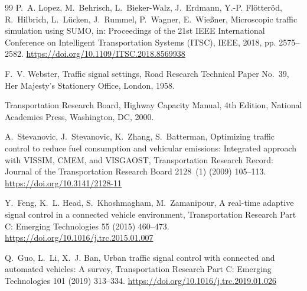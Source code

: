 \documentclass[review,3p,authoryear,times]{elsarticle}
\begin{document}
\begin{thebibliography}{99}
P.~A. Lopez, M.~Behrisch, L.~Bieker-Walz, J.~Erdmann, Y.-P. Fl\"{o}tter\"{o}d,
R.~Hilbrich, L.~L\"{u}cken, J.~Rummel, P.~Wagner, E.~Wie{\ss}ner, Microscopic
traffic simulation using SUMO, in: Proceedings of the 21st IEEE
International Conference on Intelligent Transportation Systems (ITSC),
IEEE, 2018, pp. 2575--2582.
\newline\url{https://doi.org/10.1109/ITSC.2018.8569938}

F.~V. Webster, Traffic signal settings, Road Research Technical Paper
No.~39, Her Majesty's Stationery Office, London, 1958.

Transportation Research Board, Highway Capacity Manual, 4th Edition,
National Academies Press, Washington, DC, 2000.

A.~Stevanovic, J.~Stevanovic, K.~Zhang, S.~Batterman, Optimizing traffic
control to reduce fuel consumption and vehicular emissions: Integrated
approach with VISSIM, CMEM, and VISGAOST, Transportation Research Record:
Journal of the Transportation Research Board 2128~(1) (2009) 105--113.
\newline\url{https://doi.org/10.3141/2128-11}

Y.~Feng, K.~L. Head, S.~Khoshmagham, M.~Zamanipour, A real-time adaptive
signal control in a connected vehicle environment, Transportation Research
Part C: Emerging Technologies 55 (2015) 460--473.
\newline\url{https://doi.org/10.1016/j.trc.2015.01.007}

Q.~Guo, L.~Li, X.~J. Ban, Urban traffic signal control with connected and
automated vehicles: A survey, Transportation Research Part C: Emerging
Technologies 101 (2019) 313--334.
\newline\url{https://doi.org/10.1016/j.trc.2019.01.026}

\end{thebibliography}
\end{document}
